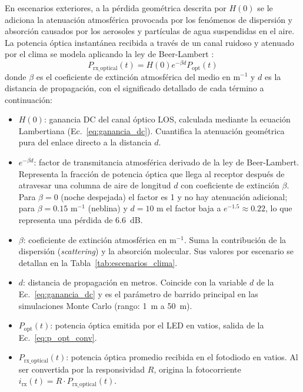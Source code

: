 En escenarios exteriores, a la pérdida geométrica descrita por $H(0)$ se le adiciona la atenuación atmosférica provocada por los fenómenos de dispersión y absorción causados por los aerosoles y partículas de agua suspendidas en el aire. La potencia óptica instantánea recibida a través de un canal ruidoso y atenuado por el clima se modela aplicando la ley de Beer-Lambert \cite{ghassemlooy2019optical}:
\begin{equation}
	P_{\text{rx\_optical}}(t) = H(0) e^{-\beta d} P_{\text{opt}}(t)
	\label{eq:beer_lambert_theory}
\end{equation}
donde $\beta$ es el coeficiente de extinción atmosférica del medio en $\text{m}^{-1}$ y $d$ es la distancia de propagación, con el significado detallado de cada término a continuación:
\begin{itemize}
\item $H(0)$: ganancia DC del canal óptico LOS, calculada mediante la ecuación Lambertiana (Ec.~\ref{eq:ganancia_dc}). Cuantifica la atenuación geométrica pura del enlace directo a la distancia $d$.
\item $e^{-\beta d}$: factor de transmitancia atmosférica derivado de la ley de Beer-Lambert. Representa la fracción de potencia óptica que llega al receptor después de atravesar una columna de aire de longitud $d$ con coeficiente de extinción $\beta$. Para $\beta = 0$ (noche despejada) el factor es 1 y no hay atenuación adicional; para $\beta = 0.15\text{ m}^{-1}$ (neblina) y $d = 10\text{ m}$ el factor baja a $e^{-1.5} \approx 0.22$, lo que representa una pérdida de 6.6~dB.
\item $\beta$: coeficiente de extinción atmosférica en $\text{m}^{-1}$. Suma la contribución de la dispersión (\textit{scattering}) y la absorción molecular. Sus valores por escenario se detallan en la Tabla~\ref{tab:escenarios_clima}.
\item $d$: distancia de propagación en metros. Coincide con la variable $d$ de la Ec.~\ref{eq:ganancia_dc} y es el parámetro de barrido principal en las simulaciones Monte Carlo (rango: 1~m a 50~m).
\item $P_{\text{opt}}(t)$: potencia óptica emitida por el LED en vatios, salida de la Ec.~\ref{eq:p_opt_conv}.
\item $P_{\text{rx\_optical}}(t)$: potencia óptica promedio recibida en el fotodiodo en vatios. Al ser convertida por la responsividad $R$, origina la fotocorriente $i_{\text{rx}}(t) = R \cdot P_{\text{rx\_optical}}(t)$.
\end{itemize}

